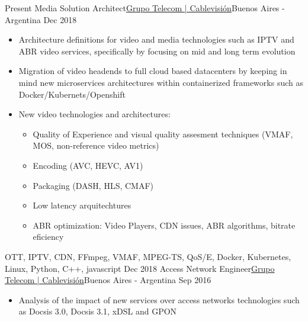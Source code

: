 %
%
%

\begin{experiences}
  \experience
    {Present}   {Media Solution Architect}{\href{https://www.cablevisionfibertel.com.ar/}{\color{accentcolor}Grupo Telecom | Cablevisión}}{Buenos Aires - Argentina}
    {Dec 2018} {
                      \begin{itemize}
                      \item Architecture definitions for video and media technologies such as IPTV and ABR video services, specifically by focusing on mid and long term evolution
                      \item Migration of video headends to full cloud based datacenters by keeping in mind new microservices architectures within containerized frameworks such as Docker/Kubernets/Openshift
                      \item New video technologies and architectures:
                        \begin{itemize}
                        \item Quality of Experience and visual quality assesment techniques (VMAF, MOS, non-reference video metrics)
                        \item Encoding (AVC, HEVC, AV1)
                        \item Packaging (DASH, HLS, CMAF) 
                        \item Low latency arquitechtures
                        \item ABR optimization: Video Players, CDN issues, ABR algorithms, bitrate eficiency
                        \end{itemize}
                      \end{itemize}
                    }
                    {OTT, IPTV, CDN, FFmpeg, VMAF, MPEG-TS, QoS/E, Docker, Kubernetes, Linux, Python, C++, javascript}
  \emptySeparator
  \experience
    {Dec 2018} {Access Network  Engineer}{\href{https://www.cablevisionfibertel.com.ar/}{\color{accentcolor}Grupo Telecom | Cablevisión}}{Buenos Aires - Argentina}
    {Sep 2016}    {
                      \begin{itemize}
                      \item Analysis of the impact of new services over access networks technologies such as Docsis 3.0, Docsis 3.1, xDSL and GPON

\end{itemize}}
\end{experiences}
